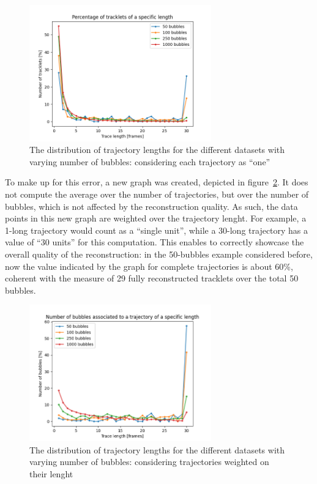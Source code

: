 \begin{figure}
	\centerline{\includegraphics[width=0.7\textwidth]{images/traj-len-graph-first.png}}
	\caption{\centering The distribution of trajectory lengths for the different datasets with varying number of bubbles: considering each trajectory as ``one''}
	\label{fig:traj-len-distr}
\end{figure}

To make up for this error, a new graph was created, depicted in figure~\ref{fig:traj-len-distr-weighted}.
It does not compute the average over the number of trajectories, but over the number of bubbles, which is not affected by the reconstruction quality.
As such, the data points in this new graph are weighted over the trajectory lenght.
For example, a 1-long trajectory would count as a ``single unit'', while a 30-long trajectory has a value of ``30 units'' for this computation.
This enables to correctly showcase the overall quality of the reconstruction: in the 50-bubbles example considered before, now the value indicated by the graph for complete trajectories is about 60\%, coherent with the measure of 29 fully reconstructed tracklets over the total 50 bubbles.
\begin{figure}
	\centerline{\includegraphics[width=0.7\textwidth]{images/traj-len-graph.png}}
	\caption{\centering The distribution of trajectory lengths for the different datasets with varying number of bubbles: considering trajectories weighted on their lenght}
	\label{fig:traj-len-distr-weighted}
\end{figure}

